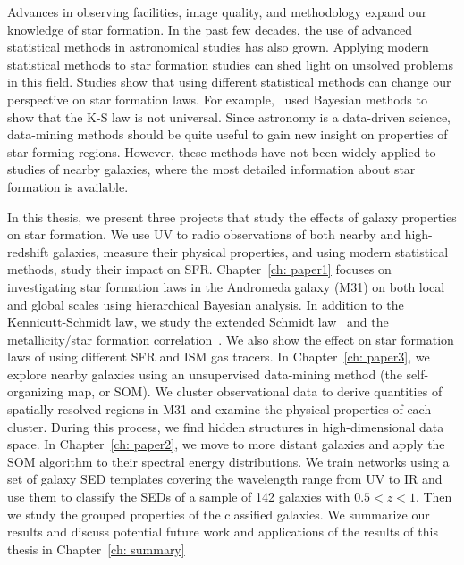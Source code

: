 Advances in observing facilities, image quality, and methodology expand our knowledge of star formation. 
In the past few decades, the use of advanced statistical methods in astronomical studies has also grown.
Applying modern statistical methods to star formation studies can shed light on unsolved problems in this field. 
Studies show that using different statistical methods can change our perspective on star formation laws. 
For example,~\cite{Shetty13} used Bayesian methods to show that the K-S law is not universal. 
Since astronomy is a data-driven science, data-mining methods should be quite useful to gain new insight on properties of star-forming regions. However, these methods have not been widely-applied to studies of nearby galaxies, where the most detailed information about star formation is available.


In this thesis, we present three projects that study the effects of galaxy properties on star formation.
We use UV to radio observations of both nearby and high-redshift galaxies, measure their physical properties, and using modern statistical methods, study their impact on SFR.
Chapter~\ref{ch: paper1} focuses on investigating star formation laws in the Andromeda galaxy (M31) on both local and global scales using hierarchical Bayesian analysis.
In addition to the Kennicutt-Schmidt law, we study the extended Schmidt law~\citep{Shi11} and the metallicity/star formation correlation~\citep{Krumholz09}.
We also show the effect on star formation laws of using different SFR and ISM gas tracers.
In Chapter~\ref{ch: paper3}, we explore nearby galaxies using an unsupervised data-mining method (the self-organizing map, or SOM).
We cluster observational data to derive quantities of spatially resolved regions in M31 and examine the physical properties of each cluster.
During this process, we find hidden structures in high-dimensional data space.
In Chapter~\ref{ch: paper2}, we move to more distant galaxies and apply the SOM algorithm to their spectral energy distributions.
We train networks using a set of galaxy SED templates covering the wavelength range from UV to IR and use them to classify the SEDs of a sample of 142 galaxies with $0.5 < z < 1$. 
Then we study the grouped properties of the classified galaxies.
We summarize our results and discuss potential future work and applications of the results of this thesis in Chapter~\ref{ch: summary}

 

